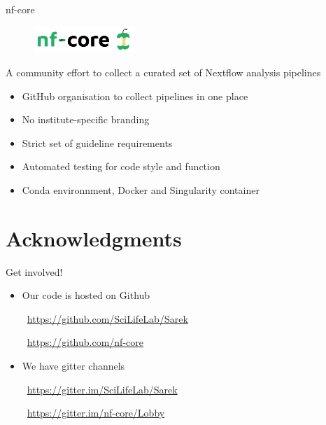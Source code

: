 \documentclass[usepdftitle=false]{beamer}
\begin{document}
\begin{frame}{nf-core}
	\begin{figure}
		\includegraphics[height=1cm]{pictures/nf-core-logo}
	\end{figure}
	A community effort to collect a curated set of Nextflow analysis pipelines
	\begin{itemize}
		\item GitHub organisation to collect pipelines in one place
		\item No institute-specific branding
		\item Strict set of guideline requirements
		\item Automated testing for code style and function
		\item Conda environnment, Docker and Singularity container
	\end{itemize}
\end{frame}

\section{Acknowledgments}

\begin{frame}{Get involved!}
	\begin{itemize}
		\item Our code is hosted on Github

		\faGithub\ \url{https://github.com/SciLifeLab/Sarek}

		\faGithub\ \url{https://github.com/nf-core}
	\end{itemize}
	\pause
	\begin{itemize}
		\item We have gitter channels

		\faGroup\ \url{https://gitter.im/SciLifeLab/Sarek}

		\faGroup\ \url{https://gitter.im/nf-core/Lobby}
	\end{itemize}
\end{frame}
\end{document}
